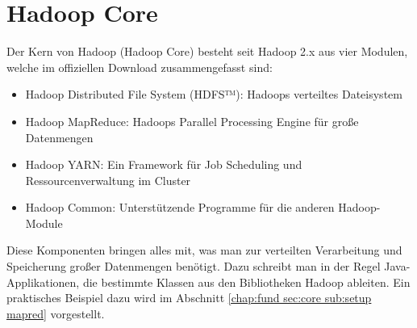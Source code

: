 \section{Hadoop Core}
Der Kern von Hadoop (Hadoop Core) besteht seit Hadoop 2.x aus vier Modulen, welche im offiziellen Download zusammengefasst sind\cite{noauthor_apache_nodate}:
\begin{itemize}
    \item Hadoop Distributed File System (HDFS™): Hadoops verteiltes Dateisystem
    \item Hadoop MapReduce: Hadoops Parallel Processing Engine für große Datenmengen
    \item Hadoop YARN: Ein Framework für Job Scheduling und Ressourcenverwaltung im Cluster
    \item Hadoop Common: Unterstützende Programme für die anderen Hadoop-Module
\end{itemize}
Diese Komponenten bringen alles mit, was man zur verteilten Verarbeitung und Speicherung großer Datenmengen benötigt. Dazu schreibt man in der Regel Java-Applikationen, die bestimmte Klassen aus den Bibliotheken Hadoop ableiten. Ein praktisches Beispiel dazu wird im Abschnitt \ref{chap:fund sec:core sub:setup mapred} vorgestellt. 

